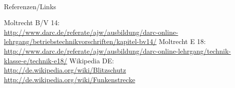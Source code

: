 \renewcommand{\refname}{Referenzen}

\hypertarget{refs}{}
\textcolor{white}{} \\ %
\Large Referenzen/Links
\footnotesize

\begin{thebibliography}{}
      Moltrecht B/V 14: \\
                    \url{http://www.darc.de/referate/ajw/ausbildung/darc-online-lehrgang/betriebstechnikvorschriften/kapitel-bv14/}
       Moltrecht E 18: \\
                    \url{http://www.darc.de/referate/ajw/ausbildung/darc-online-lehrgang/technik-klasse-e/technik-e18/}
        Wikipedia DE: \\
                    \url{http://de.wikipedia.org/wiki/Blitzschutz}\\ 
                    \url{http://de.wikipedia.org/wiki/Funkenstrecke}\\  
\end{thebibliography} 


